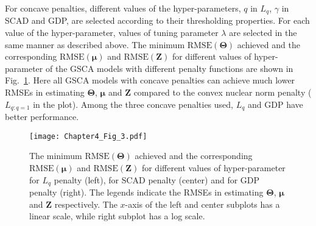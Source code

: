 For concave penalties, different values of the hyper-parameters, $q$ in $L_q$, $\gamma$ in SCAD and GDP, are selected according to their thresholding properties. For each value of the hyper-parameter, values of tuning parameter $\lambda$ are selected in the same manner as described above. The minimum $\text{RMSE}(\mathbf{\Theta})$ achieved and the corresponding $\text{RMSE}(\bm{\mu})$ and $\text{RMSE}(\mathbf{Z})$ for different values of hyper-parameter of the GSCA models with different penalty functions are shown in Fig.~\ref{chapter4_fig:3}. Here all GSCA models with concave penalties can achieve much lower RMSEs in estimating $\mathbf{\Theta}$, $\bm{\mu}$ and $\mathbf{Z}$ compared to the convex nuclear norm penalty ($L_{q:q=1}$ in the plot). Among the three concave penalties used, $L_{q}$ and GDP have better performance.
\begin{figure}[htbp]
    \centering
    \texttt{[image: Chapter4\_Fig\_3.pdf]}
    \caption{The minimum $\text{RMSE}(\mathbf{\Theta})$ achieved and the corresponding $\text{RMSE}(\bm{\mu})$ and $\text{RMSE}(\mathbf{Z})$ for different values of hyper-parameter for $L_q$ penalty (left), for SCAD penalty (center) and for GDP penalty (right). The legends indicate the RMSEs in estimating $\mathbf{\Theta}$, $\bm{\mu}$ and $\mathbf{Z}$ respectively. The $x$-axis of the left and center subplots has a linear scale, while right subplot has a log scale.}
    \label{chapter4_fig:3}
\end{figure}

